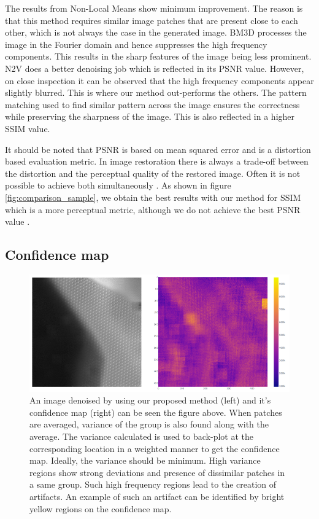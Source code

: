 \documentclass[fleqn,10pt]{wlscirep}
\begin{document}
	The results from Non-Local Means show minimum improvement. The reason is that this method requires similar image patches that are present close to each other, which is not always the case in the generated image. BM3D processes the image in the Fourier domain and hence suppresses the high frequency components. This results in the sharp features of the image being less prominent. N2V does a better denoising job which is reflected in its PSNR value. However, on close inspection it can be observed that the high frequency components appear slightly blurred. This is where our method out-performs the others. The pattern matching used to find similar pattern across the image ensures the correctness while preserving the sharpness of the image. This is also reflected in a higher SSIM value.
	
	It should be noted that PSNR is based on mean squared error and is a distortion based evaluation metric. In image restoration there is always a trade-off between the distortion and the perceptual quality of the restored image. Often it is not possible to achieve both simultaneously \cite{8578750}. As shown in figure \ref{fig:comparison_sample}, we obtain the best results with our method for SSIM which is a more perceptual metric, although we do not achieve the best PSNR value \cite{8578750}.
	
	\subsection*{Confidence map}
	
	\begin{figure}
		\centering
		\includegraphics[scale=0.7]{./imgs/confidence_map.png}
		\caption{An image denoised by using our proposed method (left) and it's confidence map (right) can be seen the figure above. When patches are averaged, variance of the group is also found along with the average. The variance calculated is used to back-plot at the corresponding location in a weighted manner to get the confidence map. Ideally, the variance should be minimum. High variance regions show strong deviations and presence of dissimilar patches in a same group. Such high frequency regions lead to the creation of artifacts. An example of such an artifact can be identified by bright yellow regions on the confidence map.}
		\label{fig:confidence_map}
	\end{figure}
	
\end{document}
